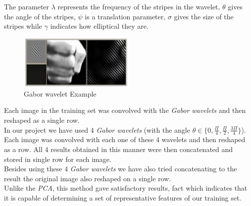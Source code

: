 \documentclass[a4paper, 11pt, twocolumn]{article}
\begin{document}
		The parameter $\lambda$ represents the frequency of the stripes in the wavelet, $\theta$ gives the angle of the stripes, $\psi$ is a translation parameter, $\sigma$ gives the size of the stripes while $\gamma$ indicates how elliptical they are.\\  
		\begin{figure}[!hbtp]
		   \centering
		   \includegraphics[width=0.5\textwidth]{gabor.png}
			\caption{Gabor wavelet Example}
	   	\end{figure}	
		\hspace*{10px}Each image in the training set was convolved with the \emph{Gabor wavelets} and then reshaped as a single row.\\
		\hspace*{10px}In our project we have used 4 \emph{Gabor wavelets} (with the angle $\theta \in \{0, \frac{\Pi}{4}, \frac{\Pi}{2}, \frac{3\Pi}{4}\}$). Each image was convolved with each one of these 4 wavelets and then reshaped as a row. All 4 results obtained in this manner were then concatenated and stored in single row for each image.\\
		\hspace*{10px}Besides using these 4 \emph{Gabor wavelets} we have also tried concatenating to the result the original image also reshaped on a single row.\\
		\hspace*{10px}Unlike the \emph{PCA}, this method gave satisfactory results, fact which indicates that it is capable of determining a set of representative features of our training set.
\end{document}

